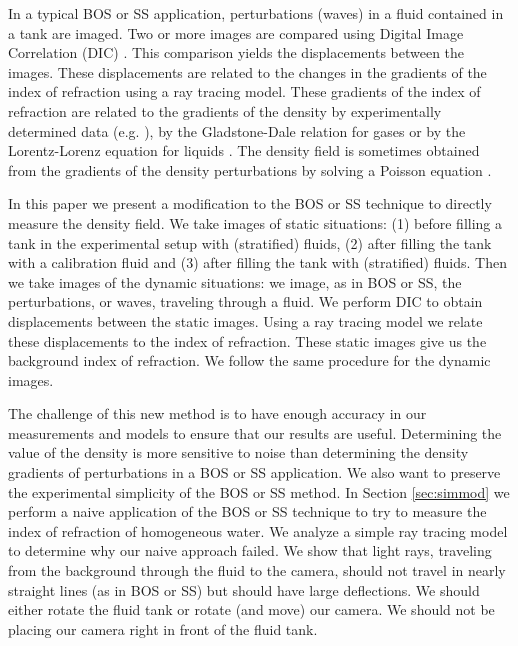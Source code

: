 \documentclass[draft]{svjour3}                     %
\begin{document}
In a typical BOS or SS application, perturbations (waves) in a fluid contained in a tank are imaged. Two or more images are compared using Digital Image Correlation (DIC) \cite{sutton2009image}. This comparison yields the displacements between the images. These displacements are related to the changes in the gradients of the index of refraction using a ray tracing model. These gradients of the index of refraction are related to the gradients of the density by experimentally determined data (e.g. \cite{tan2015dependence}), by the Gladstone-Dale relation for gases \cite{born2013principles} or by the Lorentz-Lorenz equation for liquids \cite{lorentz1916theory}. The density field is sometimes obtained from the gradients of the density perturbations by solving a Poisson equation \cite{venkatakrishnan2004density, verso2015background}.

In this paper we present a modification to the BOS or SS technique to directly measure the density field. We take images of static situations:  (1) before filling a tank in the experimental setup with (stratified) fluids, (2) after filling the tank with a calibration fluid and (3) after filling the tank with (stratified) fluids. Then we take images of the dynamic situations: we image, as in BOS or SS, the perturbations, or waves, traveling through a fluid. We perform DIC to obtain displacements between the static images. Using a ray tracing model we relate these displacements to the index of refraction. These static images give us the background index of refraction. We follow the same procedure for the dynamic images. 

The challenge of this new method is to have enough accuracy in our measurements and models to ensure that our results are useful. Determining the value of the density is more sensitive to noise than determining the density gradients of perturbations in a BOS or SS application. We also want to preserve the experimental simplicity of the BOS or SS method. In Section \ref{sec:simmod} we perform a naive application of the BOS or SS technique to try to measure the index of refraction of homogeneous water. We analyze a simple ray tracing model to determine why our naive approach failed. We show that light rays, traveling from the background through the fluid to the camera, should not travel in nearly straight lines (as in BOS or SS) but should have large deflections. We should either rotate the fluid tank or rotate (and move) our camera. We should not be placing our camera right in front of the fluid tank. 
\end{document}
